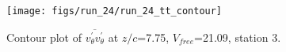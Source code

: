 \begin{figure}[H]
\centering
\texttt{[image: figs/run\_24/run\_24\_tt\_contour]}
\caption{Contour plot of $\overline{v_{\theta}^{\prime} v_{\theta}^{\prime}}$ at $z/c$=7.75, $V_{free}$=21.09, station 3.}
\label{fig:run_24_tt_contour}
\end{figure}


